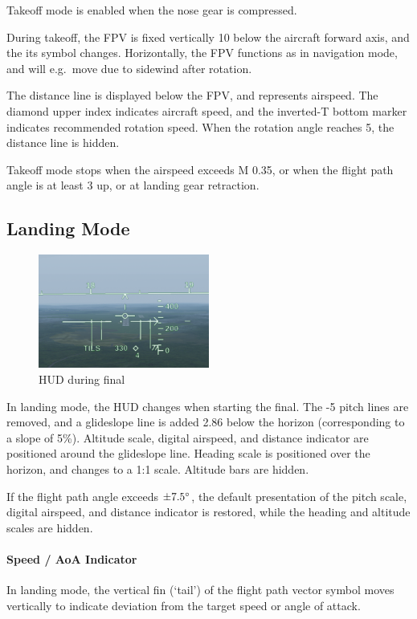 Takeoff mode is enabled when the nose gear is compressed.

During takeoff, the FPV is fixed vertically 10\textdegree{}
below the aircraft forward axis, and the its symbol changes.
Horizontally, the FPV functions as in navigation mode,
and will e.g.\ move due to sidewind after rotation.

The distance line is displayed below the FPV, and represents airspeed.
The diamond upper index indicates aircraft speed,
and the inverted-T bottom marker indicates recommended rotation speed.
When the rotation angle reaches 5\textdegree{}, the distance line is hidden.

Takeoff mode stops when the airspeed exceeds M 0.35,
or when the flight path angle is at least 3\textdegree{} up,
or at landing gear retraction.

\subsection{Landing Mode}
\begin{figure}[!ht]
  \centering
  \includegraphics[width=0.5\textwidth]{images/displays/ja-hud-landing.png}
  \caption{HUD during final}
  \label{fig:hud-landing}
\end{figure}

In landing mode, the HUD changes when starting the final.
The -5\textdegree{} pitch lines are removed,
and a glideslope line is added 2.86\textdegree{} below the horizon
(corresponding to a slope of 5\%).
Altitude scale, digital airspeed, and distance indicator are positioned around the glideslope line.
Heading scale is positioned over the horizon, and changes to a 1:1 scale.
Altitude bars are hidden.

If the flight path angle exceeds $\pm 7.5\degree$,
the default presentation of the pitch scale, digital airspeed, and distance indicator is restored,
while the heading and altitude scales are hidden.

\paragraph{Speed / AoA Indicator}
In landing mode, the vertical fin (`tail') of the flight path vector symbol
moves vertically to indicate deviation from the target speed or angle of attack.

